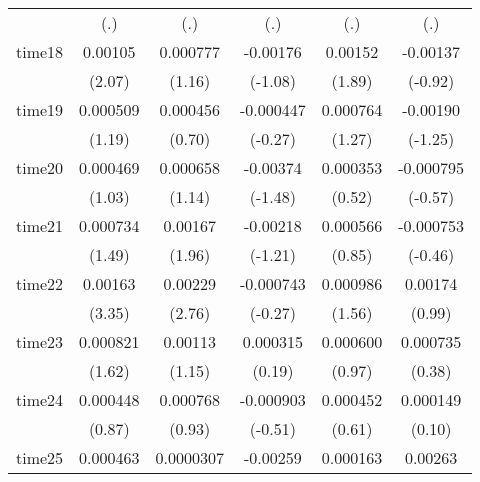 \begin{table}[htbp]
\begin{tabular}{l*{5}{c}}
            &         (.)         &         (.)         &         (.)         &         (.)         &         (.)         \\
time18      &     0.00105\sym{*}  &    0.000777         &    -0.00176         &     0.00152         &    -0.00137         \\
            &      (2.07)         &      (1.16)         &     (-1.08)         &      (1.89)         &     (-0.92)         \\
time19      &    0.000509         &    0.000456         &   -0.000447         &    0.000764         &    -0.00190         \\
            &      (1.19)         &      (0.70)         &     (-0.27)         &      (1.27)         &     (-1.25)         \\
time20      &    0.000469         &    0.000658         &    -0.00374         &    0.000353         &   -0.000795         \\
            &      (1.03)         &      (1.14)         &     (-1.48)         &      (0.52)         &     (-0.57)         \\
time21      &    0.000734         &     0.00167\sym{*}  &    -0.00218         &    0.000566         &   -0.000753         \\
            &      (1.49)         &      (1.96)         &     (-1.21)         &      (0.85)         &     (-0.46)         \\
time22      &     0.00163\sym{***}&     0.00229\sym{**} &   -0.000743         &    0.000986         &     0.00174         \\
            &      (3.35)         &      (2.76)         &     (-0.27)         &      (1.56)         &      (0.99)         \\
time23      &    0.000821         &     0.00113         &    0.000315         &    0.000600         &    0.000735         \\
            &      (1.62)         &      (1.15)         &      (0.19)         &      (0.97)         &      (0.38)         \\
time24      &    0.000448         &    0.000768         &   -0.000903         &    0.000452         &    0.000149         \\
            &      (0.87)         &      (0.93)         &     (-0.51)         &      (0.61)         &      (0.10)         \\
time25      &    0.000463         &   0.0000307         &    -0.00259         &    0.000163         &     0.00263         \\

\end{tabular}
\end{table}
